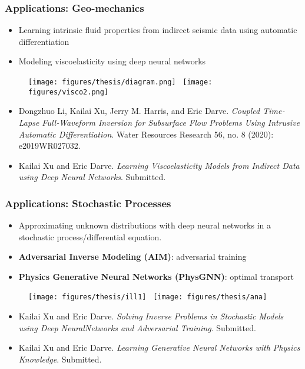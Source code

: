 \documentclass[usenames,dvipsnames]{beamer}
\begin{document}
\begin{frame}
	\frametitle{Applications: Geo-mechanics}
	
	\begin{itemize}
	\item Learning intrinsic fluid properties from indirect seismic data using automatic differentiation
	\item Modeling viscoelasticity using deep neural networks 
	\end{itemize}

	\begin{figure}[hbt]
	\centering 
	\texttt{[image: figures/thesis/diagram.png]}~
	\texttt{[image: figures/visco2.png]}
\end{figure}
	\vspace{-0.2cm}
{
	\tiny
	
	\begin{itemize}
		\item[] Dongzhuo Li, Kailai Xu, Jerry M. Harris, and Eric Darve. \textit{Coupled Time‐Lapse Full‐Waveform Inversion for Subsurface Flow Problems Using Intrusive Automatic Differentiation}. Water Resources Research 56, no. 8 (2020): e2019WR027032.
		
		\item[] 	Kailai Xu and Eric Darve. \textit{Learning Viscoelasticity Models from Indirect Data using Deep Neural Networks}. Submitted.
	\end{itemize}
}

\end{frame}



\begin{frame}
	\frametitle{Applications: Stochastic Processes}
	\begin{itemize}
		\item Approximating unknown distributions with deep neural networks in a stochastic process/differential equation. 
		\item \textbf{Adversarial Inverse Modeling (AIM)}: adversarial training
		\item \textbf{Physics Generative Neural Networks (PhysGNN)}: optimal transport
	\end{itemize}
	\begin{figure}[hbt]
		\centering
		\texttt{[image: figures/thesis/ill1]}~				\texttt{[image: figures/thesis/ana]}
	\end{figure}
	
		\vspace{-0.2cm}
	{
		\tiny
		
		\begin{itemize}
			\item[] 	Kailai Xu and Eric Darve. \textit{Solving Inverse Problems in Stochastic Models using Deep NeuralNetworks and Adversarial Training}. Submitted.
			
			\item[] 	Kailai Xu and Eric Darve. \textit{Learning Generative Neural Networks with Physics Knowledge}. Submitted.
		\end{itemize}
	}
	
\end{frame}
\end{document}
